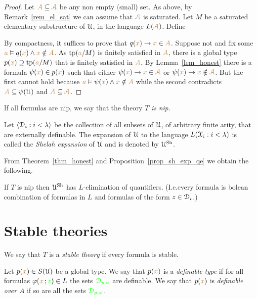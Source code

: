 \documentclass[creche.tex]{subfiles}
\begin{document}
\begin{proof}
Let ${\color{brown} A}\subseteq{\color{brown}{\EuScript A}}$ be any non empty (small) set. As above, by  Remark~\ref{rem_el_sat} we can assume that ${\color{brown}{\EuScript A}}$ is saturated. Let $M$ be a saturated elementary substructure of $\EuScript U$, in the language $L({\color{brown}{\EuScript A}})$. Define


By compactness, it suffices to prove that $q({\color{brown} x})\rightarrow {\color{brown}x}\in{\color{brown}A}$. Suppose not and fix some ${\color{brown} a}\vDash q({\color{brown} x})\wedge {\color{brown}x}\notin{\color{brown}A}$. As ${\rm tp}({\color{brown} a}/M)$ is finitely satisfied in ${\color{brown} A}$, there is a global type $p({\color{brown} x})\supseteq {\rm tp}({\color{brown} a}/M)$ that is finitely satisfied in ${\color{brown} A}$. By Lemma~\ref{lem_honest} there is a formula $\psi({\color{brown} x})\in p({\color{brown} x})$ such that either $\psi({\color{brown} x})\rightarrow {\color{brown}x}\in{\color{brown}{\EuScript A}}$ or $\psi({\color{brown} x})\rightarrow {\color{brown}x}\notin{\color{brown}{\EuScript A}}$. But the first cannot hold because ${\color{brown} a}\vDash \psi({\color{brown} x})\wedge {\color{brown}x}\notin{\color{brown}A}$ while the second contradicts ${\color{brown} A}\subseteq\psi({\color{brown}\EuScript U})$ and ${\color{brown} A}\subseteq{\color{brown}{\EuScript A}}$.
\end{proof}

If all formulas are nip, we say that the theory \emph{$T$ is nip}.

Let $\langle\EuScript D_i:i<\lambda\rangle$ be the collection of all subsets of $\EuScript U$, of arbitrary finite arity, that are externally definable. The expansion of $\EuScript U$ to the language $L(\EuScript X_i:i<\lambda)$ is called the \emph{Shelah expansion\/} of $\EuScript U$ and is denoted by \emph{$\EuScript U^{\rm Sh}$}. 

From Theorem~\ref{thm_honest} and Proposition~\ref{prop_sh_exp_qe} we obtain the following.

\begin{corollary}
If $T$ is nip then $\EuScript U^{\rm Sh}$ has $L$-elimination of quantifiers. (I.e.\@ every formula is bolean combination of formulas in $L$ and formulas of the form $z\in\EuScript D_i$.)\QED
\end{corollary}


\section{Stable theories}
\label{stable_teories}

We say that $T$ is a \emph{stable theory\/} if every formula is stable.

Let $p({\color{brown} x})\in S(\EuScript U)$ be a global type. We say that $p({\color{brown} x})$ is a \emph{definable type\/} if  for all formulas $\varphi({\color{brown} x}\,;{\color{green} z})\in L$ the sets ${\color{green}\EuScript D_{p,\varphi}}$ are definable. We say that $p({\color{brown} x})$ is  \emph{definable over $A$} if so are all the sets ${\color{green}\EuScript D_{p,\varphi}}$. 
\end{document}
